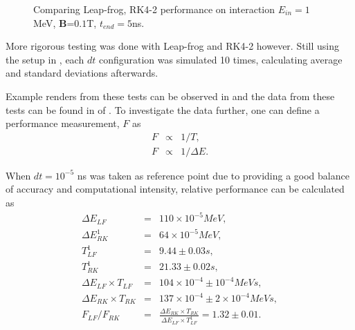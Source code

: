 \documentclass[a4paper,oneside,12pt]{report}
\numberwithin{equation}{chapter}
\begin{document}
{\begin{figure}[h]
    \vspace{5pt}
    \caption{Comparing Leap-frog, RK4-2 performance on \eB interaction $E_{in}=1$MeV, \textbf{B}=$0.1$T, $t_{end}=5$ns.}
    \label{fig:mag_lf_rk2_comparison}
\end{figure}
More rigorous testing was done with Leap-frog and RK4-2 however. 
Still using the setup in , each $dt$ configuration was simulated 10 times, calculating average and standard deviations afterwards.

Example renders from these tests can be observed in  and
the data from these tests can be found in  of .
To investigate the data further, one can define a performance measurement, $F$ as
\vspace{-20pt}\begin{eqnarray}
    F &\propto& 1/T  , \\
    F &\propto& 1/\Delta E . 
\end{eqnarray}

\vspace{-15pt}
When $dt=10^{-5}$ ns was taken as reference point due to providing a good balance of accuracy and computational intensity, 
relative performance can be calculated as
\vspace{-20pt}\begin{eqnarray} \label{eq:f_lf_rk_mag_1}
    \Delta E_{LF} &=& 110 \times 10^{-5} MeV,\\
    \Delta E_{RK}^1 &=& 64 \times 10^{-5} MeV,\\
    T_{LF}^1 &=& 9.44 \pm 0.03 s, \\
    T_{RK}^1 &=& 21.33 \pm 0.02 s, \\
    \Delta E_{LF} \times T_{LF} &=& 104 \times 10^{-4} \pm 10^{-4} MeV s, \\ %
    \Delta E_{RK} \times T_{RK} &=& 137 \times 10^{-4} \pm 2\times 10^{-4}  MeV s, \\ %
    F_{LF}/F_{RK} &=& \frac{\Delta E_{RK} \times T_{RK} }{\Delta E_{LF} \times T_{LF}^1} = 1.32 \pm 0.01 .
\end{eqnarray}

}
\end{document}
